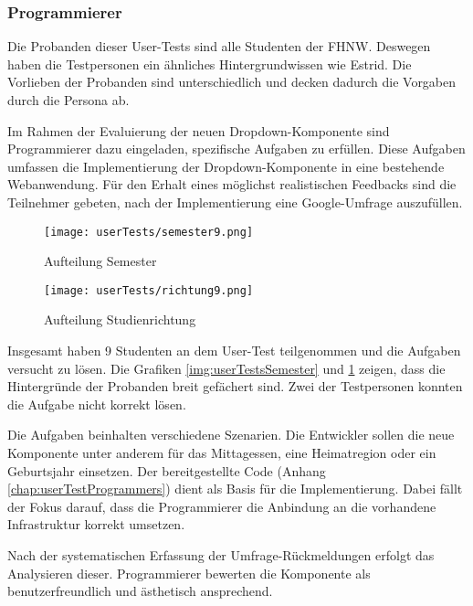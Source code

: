 \subsubsection{\color{dblue} Programmierer}
\label{sec:userTestsProgrammer}

Die Probanden dieser User-Tests sind alle Studenten der FHNW. 
Deswegen haben die Testpersonen ein ähnliches Hintergrundwissen wie Estrid. 
Die Vorlieben der Probanden sind unterschiedlich und decken dadurch die Vorgaben durch die Persona ab. 

Im Rahmen der Evaluierung der neuen Dropdown-Komponente sind Programmierer dazu eingeladen, spezifische Aufgaben zu erfüllen. 
Diese Aufgaben umfassen die Implementierung der Dropdown-Komponente in eine bestehende Webanwendung. 
Für den Erhalt eines möglichst realistischen Feedbacks sind die Teilnehmer gebeten, nach der Implementierung eine Google-Umfrage auszufüllen. 

\begin{figure}[!htb]
    \centering
    \begin{minipage}[b]{0.45\textwidth}
        \centering
        \texttt{[image: userTests/semester9.png]}
        \caption{\centering Aufteilung Semester}
        \label{img:userTestsSemester}
    \end{minipage}
    \hfill
    \begin{minipage}[b]{0.45\textwidth}
        \centering
        \texttt{[image: userTests/richtung9.png]}
        \caption{\centering Aufteilung Studienrichtung}
        \label{img:userTestsStudy}
    \end{minipage}
\end{figure}

Insgesamt haben 9 Studenten an dem User-Test teilgenommen und die Aufgaben versucht zu lösen. 
Die Grafiken \ref{img:userTestsSemester} und \ref{img:userTestsStudy} zeigen, dass die Hintergründe der Probanden breit gefächert sind. 
Zwei der Testpersonen konnten die Aufgabe nicht korrekt lösen. 

Die Aufgaben beinhalten verschiedene Szenarien. 
Die Entwickler sollen die neue Komponente unter anderem für das Mittagessen, eine Heimatregion oder ein Geburtsjahr einsetzen. 
Der bereitgestellte Code (Anhang \ref{chap:userTestProgrammers}) dient als Basis für die Implementierung. 
Dabei fällt der Fokus darauf, dass die Programmierer die Anbindung an die vorhandene Infrastruktur korrekt umsetzen. 

Nach der systematischen Erfassung der Umfrage-Rückmeldungen erfolgt das Analysieren dieser. 
Programmierer bewerten die Komponente als benutzerfreundlich und ästhetisch ansprechend. 

